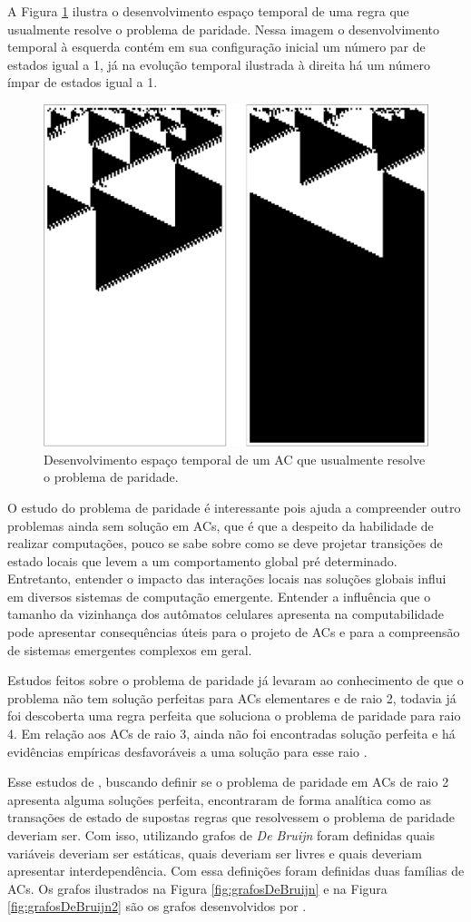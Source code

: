 \documentclass[12pt,a4paper]{article}
\begin{document}
 A Figura \ref{fig:parity-rule} ilustra o desenvolvimento espaço temporal de uma regra que usualmente resolve o problema de paridade. Nessa imagem o desenvolvimento temporal à esquerda contém em sua configuração inicial um número par de estados igual a 1, já na evolução temporal ilustrada à direita há um número ímpar de estados igual a 1.

	\begin{figure}[h!]
	  \centering
	  \includegraphics[width=.5\textwidth]{regra1}
        \caption{Desenvolvimento espaço temporal de um AC que usualmente resolve o problema de paridade.}
        \label{fig:parity-rule}
	\end{figure}


 O estudo do problema de paridade é interessante pois ajuda a compreender outro problemas ainda sem solução em ACs, que é que a despeito da habilidade de realizar computações, pouco se sabe sobre como se deve projetar transições de estado locais que levem a um comportamento global pré determinado. Entretanto, entender o impacto das interações locais nas soluções globais influi em diversos sistemas de computação emergente. Entender a influência que o tamanho da vizinhança dos autômatos celulares apresenta na computabilidade pode apresentar consequências úteis para o projeto de ACs e para a compreensão de sistemas emergentes complexos em geral.

 Estudos feitos sobre o problema de paridade já levaram ao conhecimento de que o problema não tem solução perfeitas para ACs elementares e de raio 2, todavia já foi descoberta uma regra perfeita que soluciona o problema de paridade para raio 4. Em relação aos ACs de raio 3, ainda não foi encontradas solução perfeita e há evidências empíricas desfavoráveis a uma solução para esse raio \cite{Betel2013}.

 Esse estudos de , buscando definir se o problema de paridade em ACs de raio 2 apresenta alguma soluções perfeita, encontraram de forma analítica como as transações de estado de supostas regras que resolvessem o problema de paridade deveriam ser. Com isso, utilizando grafos de \textit{De Bruijn} foram definidas quais variáveis deveriam ser estáticas, quais deveriam ser livres e quais deveriam apresentar interdependência. Com essa definições foram definidas duas famílias de ACs. Os grafos ilustrados na Figura \ref{fig:grafosDeBruijn} e na Figura \ref{fig:grafosDeBruijn2} são os grafos desenvolvidos por .
	
\end{document}
